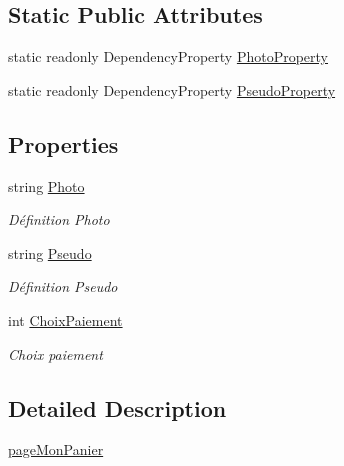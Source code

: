 \subsection*{Static Public Attributes}
\begin{DoxyCompactItemize}
\item 
static readonly Dependency\+Property \hyperlink{classnewPizza1_1_1pageMonPanier_aac88be6f84935fce54180f3f18c4a3b4}{Photo\+Property}
\item 
static readonly Dependency\+Property \hyperlink{classnewPizza1_1_1pageMonPanier_ae3d4d6fe150e64a229c72169c535e007}{Pseudo\+Property}
\end{DoxyCompactItemize}
\subsection*{Properties}
\begin{DoxyCompactItemize}
\item 
string \hyperlink{classnewPizza1_1_1pageMonPanier_a9d92e585ab933b780bc030bc1796010c}{Photo}
\begin{DoxyCompactList}\small\item\em Définition Photo \end{DoxyCompactList}\item 
string \hyperlink{classnewPizza1_1_1pageMonPanier_a3b25bd9224ceb331caa78dbe820b6869}{Pseudo}
\begin{DoxyCompactList}\small\item\em Définition Pseudo \end{DoxyCompactList}\item 
int \hyperlink{classnewPizza1_1_1pageMonPanier_a7fc71b5e84ef5b4cfc6d9e9cacc3ac2a}{Choix\+Paiement}
\begin{DoxyCompactList}\small\item\em Choix paiement \end{DoxyCompactList}\end{DoxyCompactItemize}


\subsection{Detailed Description}
\hyperlink{classnewPizza1_1_1pageMonPanier}{page\+Mon\+Panier} 

